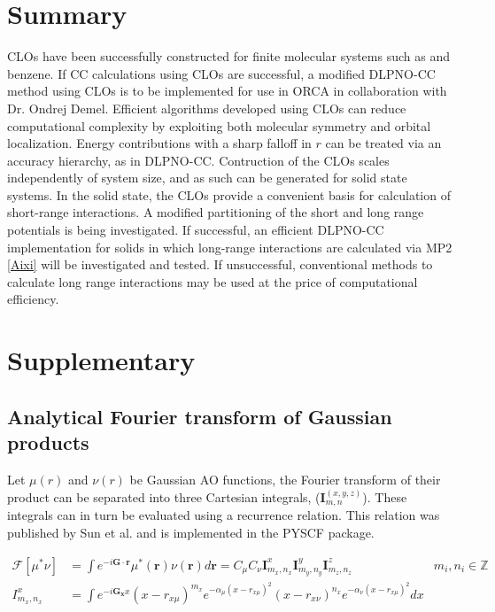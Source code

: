 \documentclass[letterpaper, 12pt]{article}
\newcommand{\matr}[1]{\bm{#1}} %
\begin{document}
\section{Summary}
CLOs have been successfully constructed for finite molecular systems such as  and benzene. If CC calculations using CLOs are successful, a modified DLPNO-CC method using CLOs is to be implemented for use in ORCA in collaboration with Dr. Ondrej Demel. Efficient algorithms developed using CLOs can reduce computational complexity by exploiting both molecular symmetry and orbital localization. Energy contributions with a sharp falloff in $r$ can be treated via an accuracy hierarchy, as in DLPNO-CC. Contruction of the CLOs scales independently of system size, and as such can be generated for solid state systems. In the solid state, the CLOs provide a convenient basis for calculation of short-range interactions. A modified partitioning of the short and long range potentials is being investigated. If successful, an efficient DLPNO-CC implementation for solids in which long-range interactions are calculated via MP2 \eqref{Aixi} will be investigated and tested. If unsuccessful, conventional methods to calculate long range interactions may be used at the price of computational efficiency. 

\section{Supplementary}
\subsection{Analytical Fourier transform of Gaussian products}
Let $\mu(r)$ and $\nu(r)$ be Gaussian AO functions, the Fourier transform of their product can be separated into three Cartesian integrals, ($\matr{I}^{(x,y,z)}_{m,n}$). These integrals can in turn be evaluated using a recurrence relation. This relation was published by Sun et al. \cite{sun} and is implemented in the PYSCF package.

\begin{align*}
\mathcal{F}[\mu^* \nu]&=\int e^{-i \matr{G} \cdot \matr{r}} \mu^{*}(\matr{r}) \nu(\matr{r}) d\matr{r} = C_{\mu} C_{\nu} \matr{I}^x_{m_x, n_x} \matr{I}^y_{m_y, n_y} \matr{I}^z_{m_z, n_z} & m_i, n_i \in \mathbb{Z} \\
I^{x}_{m_x, n_x} &= \int e^{-i \matr{G_x} x} (x-r_{x \mu})^{m_x} e^{- \alpha_{\mu} (x-r_{x \mu})^2} (x-r_{x \nu})^{n_x} e^{-\alpha_{\nu} (x-r_{x\mu})^2} dx
\end{align*}
\end{document}
